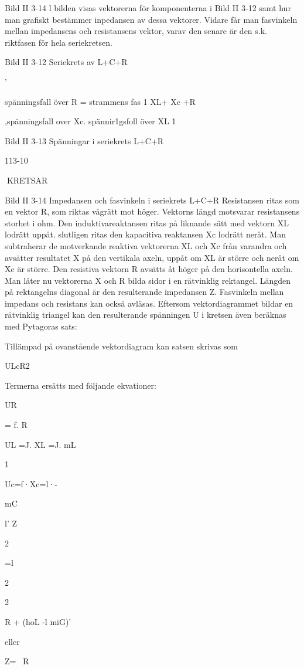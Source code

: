 {Bild II 3-14
l bilden visas vektorerna för komponenterna i Bild II 3-12 samt hur man grafiskt
bestämmer inpedansen av dessa vektorer.
Vidare får man fasvinkeln mellan impedansens och resistansens vektor, varav den senare är den s.k. riktfasen för hela seriekretsen.

Bild II 3-12 Seriekrets av L+C+R

'

spänningsfall över R
= strammens fas 1 XL+ Xc +R

,spänningsfall over Xc.
spännir1gsfoll över XL
1

Bild II 3-13 Spänningar i seriekrets L+C+R

113-10

KRETSAR

Bild II 3-14 Impedansen och fasvinkeln i seriekrets L+C+R
Resistansen ritas som en vektor R, som
riktas vågrätt mot höger. Vektorns längd
motsvarar resistansens storhet i ohm.
Den induktivareaktansen ritas på liknande sätt med vektorn XL lodrätt uppåt. slutligen ritas den kapacitiva reaktansen Xc lodrätt neråt.
Man subtraherar de motverkande reaktiva vektorerna XL och Xc från varandra och
avsätter resultatet X på den vertikala axeln,
uppåt om XL är större och neråt om Xc är
större. Den resistiva vektorn R avsätts åt
höger på den horisontella axeln.
Man låter nu vektorerna X och R bilda
sidor i en rätvinklig rektangel. Längden på
rektangelns diagonal är den resulterande
impedansen Z. Fasvinkeln mellan impedans
och resistans kan också avläsas.
Eftersom vektordiagrammet bildar en rätvinklig triangel kan den resulterande spänningen U i kretsen även beräknas med
Pytagoras sats:

Tillämpad på ovanstående vektordiagram
kan satsen skrivas som

ULcR2

Termerna ersätts med följande ekvationer:

UR

= f. R

UL =J. XL =J. mL

1

Uc=f·Xc=l·-

mC

l' Z

2

=l

2

2

R + (hoL -l miG)'

eller

Z= ~R

}
